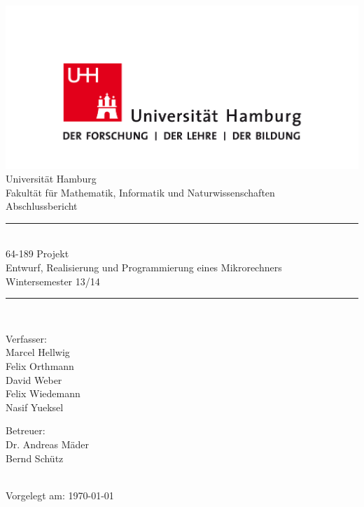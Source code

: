 \documentclass[11pt,paper=a4wide,pagesize=auto,twoside,DIV=15]{scrreprt}
\begin{document}
\begin{fullsizetitle}
\centering
\begin{minipage}{0.75\textwidth}
\vspace*{5em}
\begin{center}
\includegraphics[width=\textwidth]{images/uhh.png}\\
\vspace*{4em}
{\LARGE Universität Hamburg}\\[.25em]
{\Large Fakultät für Mathematik, Informatik und Naturwissenschaften}\\[3em]
{\Huge Abschlussbericht}\\[3em]

\newcommand{\HRule}{\rule{\linewidth}{0.5mm}}
\HRule\\[.4em]
{\Large%
64-189 Projekt\\%
Entwurf, Realisierung und Programmierung eines Mikrorechners\\%
Wintersemester 13/14\\%
}
\HRule\\[3em]

\begin{minipage}[t]{0.4\textwidth}
\begin{flushleft} \large
Verfasser:\\[1em]%
Marcel Hellwig\\%
Felix Orthmann\\%
David Weber\\%
Felix Wiedemann\\%
Nasif Yueksel%
\end{flushleft}
\end{minipage}
\hfill
\begin{minipage}[t]{0.4\textwidth}
\begin{flushright} \large
Betreuer:\\[1em]
Dr. Andreas Mäder\\%
Bernd Schütz%
\end{flushright}
\end{minipage} \\[12em]

{\large Vorgelegt am: \today}
\end{center}
\end{minipage}
\end{fullsizetitle}
\end{document}
